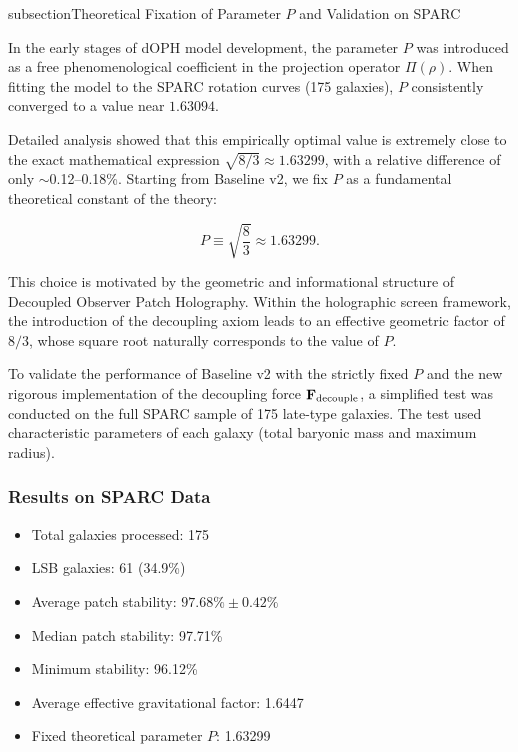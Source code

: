 subsection{Theoretical Fixation of Parameter \( P \) and Validation on SPARC}

In the early stages of dOPH model development, the parameter \( P \) was introduced as a free phenomenological coefficient in the projection operator \(\Pi(\rho)\). When fitting the model to the SPARC rotation curves (175 galaxies), \( P \) consistently converged to a value near \( 1.63094 \).

Detailed analysis showed that this empirically optimal value is extremely close to the exact mathematical expression \( \sqrt{8/3} \approx 1.63299 \), with a relative difference of only $\sim$0.12--0.18\%. Starting from Baseline v2, we fix \( P \) as a fundamental theoretical constant of the theory:

\begin{equation}
P \equiv \sqrt{\frac{8}{3}} \approx 1.63299.
\end{equation}

This choice is motivated by the geometric and informational structure of Decoupled Observer Patch Holography. Within the holographic screen framework, the introduction of the decoupling axiom leads to an effective geometric factor of \( 8/3 \), whose square root naturally corresponds to the value of \( P \).

To validate the performance of Baseline v2 with the strictly fixed \( P \) and the new rigorous implementation of the decoupling force \(\mathbf{F}_{\rm decouple}\), a simplified test was conducted on the full SPARC sample of 175 late-type galaxies. The test used characteristic parameters of each galaxy (total baryonic mass and maximum radius).

\subsubsection{Results on SPARC Data}

\begin{itemize}
    \item Total galaxies processed: 175
    \item LSB galaxies: 61 (34.9\%)
    \item Average patch stability: \( 97.68\% \pm 0.42\% \)
    \item Median patch stability: 97.71\%
    \item Minimum stability: 96.12\%
    \item Average effective gravitational factor: 1.6447
    \item Fixed theoretical parameter \( P \): 1.63299
\end{itemize}

